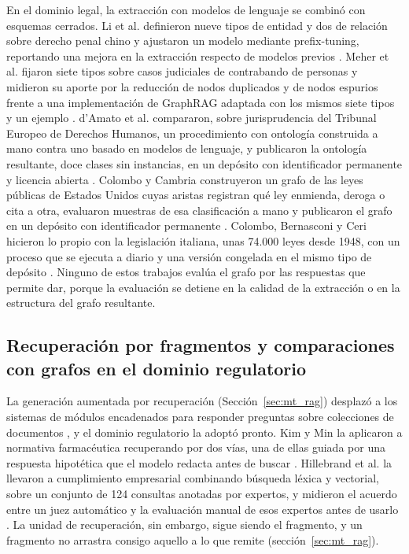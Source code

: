 \documentclass[12pt,a4paper]{report}
\begin{document}
En el dominio legal, la extracción con modelos de lenguaje se combinó con esquemas cerrados. Li et al. definieron nueve tipos de entidad y dos de relación sobre derecho penal chino y ajustaron un modelo mediante prefix-tuning, reportando una mejora en la extracción respecto de modelos previos \cite{li2024jkem}. Meher et al. fijaron siete tipos sobre casos judiciales de contrabando de personas y midieron su aporte por la reducción de nodos duplicados y de nodos espurios frente a una implementación de GraphRAG \cite{edge2024graphrag} adaptada con los mismos siete tipos y un ejemplo \cite{meher2025corekg,meher2025linkkg}. d'Amato et al. compararon, sobre jurisprudencia del Tribunal Europeo de Derechos Humanos, un procedimiento con ontología construida a mano contra uno basado en modelos de lenguaje, y publicaron la ontología resultante, doce clases sin instancias, en un depósito con identificador permanente y licencia abierta \cite{damato2025legalkgvaw}. Colombo y Cambria construyeron un grafo de las leyes públicas de Estados Unidos cuyas aristas registran qué ley enmienda, deroga o cita a otra, evaluaron muestras de esa clasificación a mano y publicaron el grafo en un depósito con identificador permanente \cite{colombo2025legislative}. Colombo, Bernasconi y Ceri hicieron lo propio con la legislación italiana, unas 74.000 leyes desde 1948, con un proceso que se ejecuta a diario y una versión congelada en el mismo tipo de depósito \cite{colombo2025italian}. Ninguno de estos trabajos evalúa el grafo por las respuestas que permite dar, porque la evaluación se detiene en la calidad de la extracción o en la estructura del grafo resultante.

\subsection{Recuperación por fragmentos y comparaciones con grafos en el dominio regulatorio}

La generación aumentada por recuperación (Sección~\ref{sec:mt_rag}) desplazó a los sistemas de módulos encadenados para responder preguntas sobre colecciones de documentos \cite{lewis2020rag}, y el dominio regulatorio la adoptó pronto. Kim y Min la aplicaron a normativa farmacéutica recuperando por dos vías, una de ellas guiada por una respuesta hipotética que el modelo redacta antes de buscar \cite{kim2024qarag}. Hillebrand et al. la llevaron a cumplimiento empresarial combinando búsqueda léxica y vectorial, sobre un conjunto de 124 consultas anotadas por expertos, y midieron el acuerdo entre un juez automático y la evaluación manual de esos expertos antes de usarlo \cite{hillebrand2024ragchatbot}. La unidad de recuperación, sin embargo, sigue siendo el fragmento, y un fragmento no arrastra consigo aquello a lo que remite (sección~\ref{sec:mt_rag}).
\end{document}
